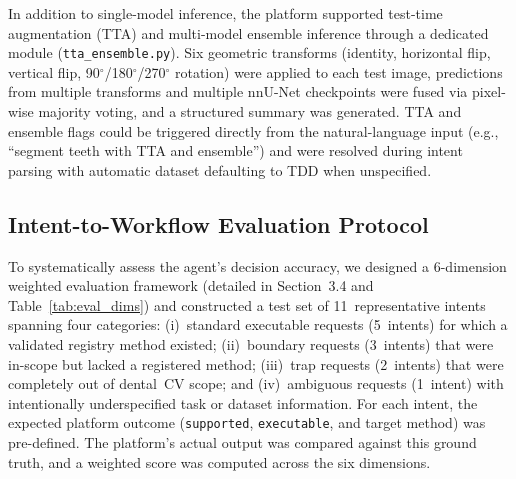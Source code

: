
In addition to single-model inference, the platform supported test-time
augmentation (TTA) and multi-model ensemble inference through a dedicated module
(\texttt{tta\_ensemble.py}). Six geometric transforms (identity, horizontal flip,
vertical flip, 90$^\circ$/180$^\circ$/270$^\circ$ rotation) were applied to each
test image, predictions from multiple transforms and multiple nnU-Net checkpoints
were fused via pixel-wise majority voting, and a structured summary was generated.
TTA and ensemble flags could be triggered directly from the natural-language input
(e.g., ``segment teeth with TTA and ensemble'') and were resolved during intent
parsing with automatic dataset defaulting to TDD when unspecified.



\subsection{Intent-to-Workflow Evaluation Protocol}

To systematically assess the agent's decision accuracy, we designed a 6-dimension
weighted evaluation framework (detailed in Section~3.4 and Table~\ref{tab:eval_dims})
and constructed a test set of 11~representative intents spanning four categories:
(i)~standard executable requests (5~intents) for which a validated registry method
existed; (ii)~boundary requests (3~intents) that were in-scope but lacked a
registered method; (iii)~trap requests (2~intents) that were completely out of
dental~CV scope; and (iv)~ambiguous requests (1~intent) with intentionally
underspecified task or dataset information. For each intent, the expected platform
outcome (\texttt{supported}, \texttt{executable}, and target method) was
pre-defined. The platform's actual output was compared against this ground truth,
and a weighted score was computed across the six dimensions.


